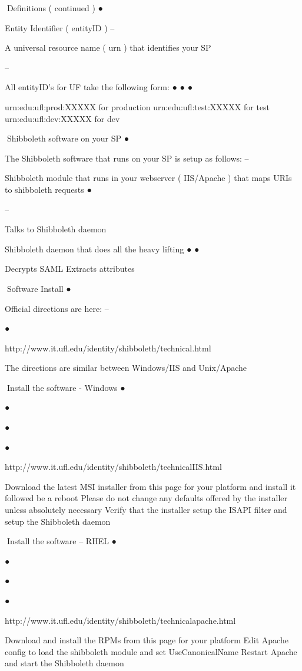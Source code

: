 Definitions ( continued )
●

Entity Identifier ( entityID )
–

A universal resource name ( urn ) that
identifies your SP

–

All entityID's for UF take the following form:
●
●
●

urn:edu:ufl:prod:XXXXX for production
urn:edu:ufl:test:XXXXX for test
urn:edu:ufl:dev:XXXXX for dev

Shibboleth software on your SP
●

The Shibboleth software that runs on your
SP is setup as follows:
–

Shibboleth module that runs in your
webserver ( IIS/Apache ) that maps URIs
to shibboleth requests
●

–

Talks to Shibboleth daemon

Shibboleth daemon that does all the heavy
lifting
●
●

Decrypts SAML
Extracts attributes

Software Install
●

Official directions are here:
–

●

http://www.it.ufl.edu/identity/shibboleth/technical.html

The directions are similar between
Windows/IIS and Unix/Apache

Install the software - Windows
●

●

●

●

http://www.it.ufl.edu/identity/shibboleth/technicalIIS.html

Download the latest MSI installer from this
page for your platform and install it
followed be a reboot
Please do not change any defaults offered
by the installer unless absolutely
necessary
Verify that the installer setup the ISAPI filter
and setup the Shibboleth daemon

Install the software – RHEL
●

●

●

●

http://www.it.ufl.edu/identity/shibboleth/technicalapache.html

Download and install the RPMs from this
page for your platform
Edit Apache config to load the shibboleth
module and set UseCanonicalName
Restart Apache and start the Shibboleth
daemon

